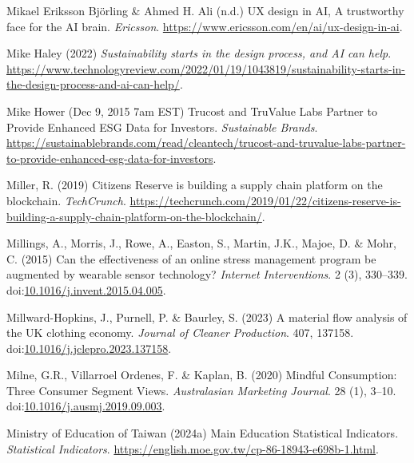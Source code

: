 \documentclass[
  letterpaper,
  DIV=11,
  numbers=noendperiod]{scrartcl}
\newlength{\cslhangindent}
\newenvironment{CSLReferences}[2] %
 {\begin{list}{}{%
  \setlength{\itemindent}{0pt}
  \setlength{\leftmargin}{0pt}
  \setlength{\parsep}{0pt}
  \ifodd #1
   \setlength{\leftmargin}{\cslhangindent}
   \setlength{\itemindent}{-1\cslhangindent}
  \fi
  \setlength{\itemsep}{#2\baselineskip}}}
 {\end{list}}
\begin{document}
\begin{CSLReferences}{0}{1}
Mikael Eriksson Björling \& Ahmed H. Ali (n.d.) {UX} design in {AI}, {A}
trustworthy face for the {AI} brain. \emph{Ericsson}.
\url{https://www.ericsson.com/en/ai/ux-design-in-ai}.

Mike Haley (2022) \emph{Sustainability starts in the design process, and
{AI} can help}.
\url{https://www.technologyreview.com/2022/01/19/1043819/sustainability-starts-in-the-design-process-and-ai-can-help/}.

Mike Hower (Dec 9, 2015 7am EST) Trucost and {TruValue Labs Partner} to
{Provide Enhanced ESG Data} for {Investors}. \emph{Sustainable Brands}.
\url{https://sustainablebrands.com/read/cleantech/trucost-and-truvalue-labs-partner-to-provide-enhanced-esg-data-for-investors}.

Miller, R. (2019) Citizens {Reserve} is building a supply chain platform
on the blockchain. \emph{TechCrunch}.
\url{https://techcrunch.com/2019/01/22/citizens-reserve-is-building-a-supply-chain-platform-on-the-blockchain/}.

Millings, A., Morris, J., Rowe, A., Easton, S., Martin, J.K., Majoe, D.
\& Mohr, C. (2015) Can the effectiveness of an online stress management
program be augmented by wearable sensor technology? \emph{Internet
Interventions}. 2 (3), 330--339.
doi:\href{https://doi.org/10.1016/j.invent.2015.04.005}{10.1016/j.invent.2015.04.005}.

Millward-Hopkins, J., Purnell, P. \& Baurley, S. (2023) A material flow
analysis of the {UK} clothing economy. \emph{Journal of Cleaner
Production}. 407, 137158.
doi:\href{https://doi.org/10.1016/j.jclepro.2023.137158}{10.1016/j.jclepro.2023.137158}.

Milne, G.R., Villarroel Ordenes, F. \& Kaplan, B. (2020) Mindful
{Consumption}: {Three Consumer Segment Views}. \emph{Australasian
Marketing Journal}. 28 (1), 3--10.
doi:\href{https://doi.org/10.1016/j.ausmj.2019.09.003}{10.1016/j.ausmj.2019.09.003}.

Ministry of Education of Taiwan (2024a) Main {Education Statistical
Indicators}. \emph{Statistical Indicators}.
\url{https://english.moe.gov.tw/cp-86-18943-e698b-1.html}.


\end{CSLReferences}
\end{document}
